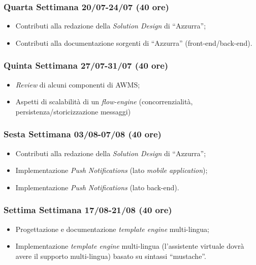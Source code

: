 \begin{trivlist}
\item \subsubsection{Quarta Settimana 20/07-24/07 (40 ore)}
\begin{itemize}
	\item Contributi alla redazione della \emph{Solution Design} di “Azzurra”;
	\item Contributi alla documentazione sorgenti di “Azzurra” (\gls{front-end}\ap{[g]}/\gls{back-end}\glsfirstoccur).
\end{itemize}

\item \subsubsection{Quinta Settimana 27/07-31/07 (40 ore)}
\begin{itemize}
	\item \emph{Review} di alcuni componenti di \gls{AWMS};
	\item Aspetti di scalabilità di un \emph{flow-engine} (concorrenzialità, persistenza/storicizzazione messaggi)
\end{itemize}

\item \subsubsection{Sesta Settimana 03/08-07/08 (40 ore)}
\begin{itemize}
	\item Contributi alla redazione della \emph{Solution Design} di “Azzurra”;
	\item Implementazione \emph{Push Notifications} (lato \emph{mobile} \emph{application});
	\item Implementazione \emph{Push Notifications} (lato \gls{back-end}\ap{[g]}).
\end{itemize}

\item \subsubsection{Settima Settimana 17/08-21/08 (40 ore)}
\begin{itemize}
	\item Progettazione e documentazione \emph{template engine} multi-lingua;
	\item Implementazione \emph{template engine} multi-lingua (l’assistente virtuale dovrà avere il supporto multi-lingua) basato su sintassi “mustache”.
\end{itemize}	


\end{trivlist}
